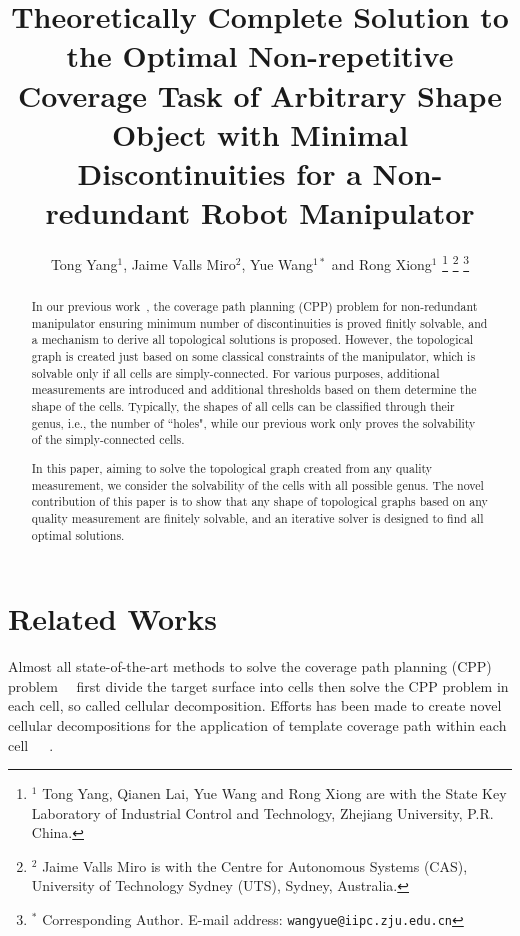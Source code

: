\documentclass[conference]{IEEEtran}
\begin{document}
\title{Theoretically Complete Solution to the Optimal Non-repetitive Coverage Task of Arbitrary Shape Object with Minimal Discontinuities for a Non-redundant Robot Manipulator}

\author{Tong Yang$^1$, Jaime Valls Miro$^2$, Yue Wang$^{1*}$ and Rong Xiong$^1$
\thanks{$^1$ Tong Yang, Qianen Lai, Yue Wang and Rong Xiong are with the State Key 
Laboratory of Industrial Control and Technology, Zhejiang University, P.R. China. 
}
\thanks{$^2$ Jaime Valls Miro is with the Centre for Autonomous Systems (CAS), University of Technology Sydney (UTS), Sydney, Australia.}
\thanks{$^*$ Corresponding Author. \newline \indent
E-mail address: {\tt\small wangyue@iipc.zju.edu.cn}}
}

\maketitle

\begin{abstract}


In our previous work~\cite{}, the coverage path planning (CPP) problem for non-redundant manipulator ensuring minimum number of discontinuities is proved finitly solvable, and a mechanism to derive all topological solutions is proposed. However, the topological graph is created just based on some classical constraints of the manipulator, which is solvable only if all cells are simply-connected. 
For various purposes, additional measurements are introduced and additional thresholds based on them determine the shape of the cells. 
Typically, the shapes of all cells can be classified through their genus, i.e., the number of ``holes", while our previous work only proves the solvability of the simply-connected cells. 

In this paper, aiming to solve the topological graph created from any quality measurement, we consider the solvability of the cells with all possible genus. 
The novel contribution of this paper is to show that any shape of topological graphs based on any quality measurement are finitely solvable, and an iterative solver is designed to find all optimal solutions. 


\end{abstract}

\IEEEpeerreviewmaketitle

\section{Related Works}\label{section_related_works}
Almost all state-of-the-art methods to solve the coverage path planning (CPP) problem~\cite{choset2001coverage}~\cite{galceran2013a}
first divide the target surface into cells then solve the CPP problem in each cell, so called cellular decomposition. Efforts has been made to create novel cellular decompositions for the application of template coverage path within each cell~\cite{choset2000exact}~\cite{Acar2002Morse}~\cite{lumelsky1990dynamic}. 
\end{document}
